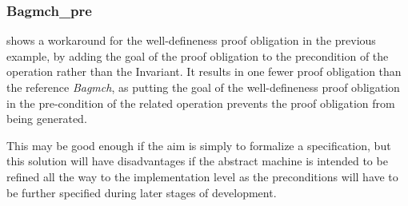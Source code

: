 \documentclass[12pt,journal,duplex]{IEEEtran}
\begin{document}
	\subsubsection{Bagmch\_pre} shows a workaround for the well-defineness proof obligation in the previous example, by adding the goal of the proof obligation to the precondition of the operation rather than the Invariant. It results in one fewer proof obligation than the reference \emph{Bagmch}, as putting the goal of the well-defineness proof obligation in the pre-condition of the related operation prevents the proof obligation from being generated.

	 This may be good enough if the aim is simply to formalize a specification, but this solution will have disadvantages if the abstract machine is intended to be refined all the way to the implementation level as the preconditions will have to be further specified during later stages of development.
\end{document}

